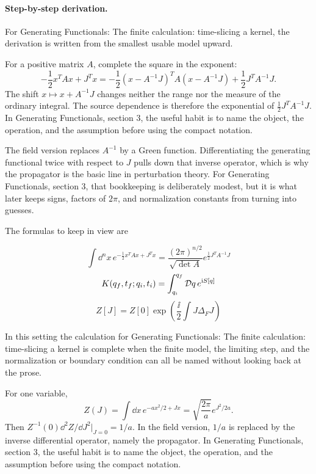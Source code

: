 \paragraph{Step-by-step derivation.}

For Generating Functionals: The finite calculation: time-slicing a kernel, the derivation is written from the smallest usable model upward.

For a positive matrix \(A\), complete the square in the exponent:
\[
  -\frac12x^TAx+J^Tx
  =
  -\frac12(x-A^{-1}J)^TA(x-A^{-1}J)
  +\frac12J^TA^{-1}J.
\]
The shift \(x\mapsto x+A^{-1}J\) changes neither the range nor the measure of the ordinary integral.  The source dependence is therefore the exponential of \(\frac12J^TA^{-1}J\).  In Generating Functionals, section 3, the useful habit is to name the object, the operation, and the assumption before using the compact notation.

The field version replaces \(A^{-1}\) by a Green function.  Differentiating the generating functional twice with respect to \(J\) pulls down that inverse operator, which is why the propagator is the basic line in perturbation theory.  For Generating Functionals, section 3, that bookkeeping is deliberately modest, but it is what later keeps signs, factors of \(2\pi\), and normalization constants from turning into guesses.

The formulas to keep in view are

\[
  \int\dd^n x\,e^{-\frac12x^TAx+J^Tx}=\frac{(2\pi)^{n/2}}{\sqrt{\det A}}e^{\frac12J^TA^{-1}J}
\]
\[
  K(q_f,t_f;q_i,t_i)=\int_{q_i}^{q_f}\mathcal D q\,e^{\mathrm i S[q]}
\]
\[
  Z[J]=Z[0]\exp\left(\frac{\ii}{2}\int J\Delta_FJ\right)
\]

In this setting the calculation for Generating Functionals: The finite calculation: time-slicing a kernel is complete when the finite model, the limiting step, and the normalization or boundary condition can all be named without looking back at the prose.




\begin{example}
For one variable,
\[
  Z(J)=\int\dd x\,e^{-ax^2/2+Jx}
  =\sqrt{\frac{2\pi}{a}}e^{J^2/2a}.
\]
Then \(Z^{-1}(0)\dd^2Z/\dd J^2|_{J=0}=1/a\).  In the field version, \(1/a\) is replaced by the inverse differential operator, namely the propagator.  In Generating Functionals, section 3, the useful habit is to name the object, the operation, and the assumption before using the compact notation.
\end{example}



